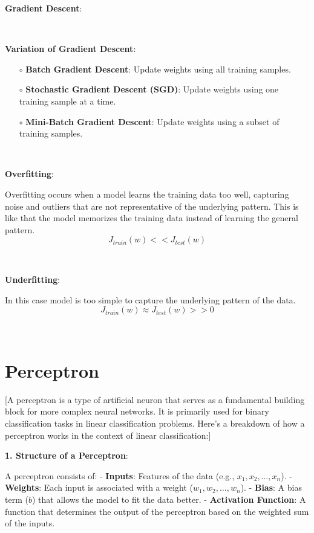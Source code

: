 \documentclass{article}
\newenvironment{cheatformula}[1][כותרת]{
    \begin{minipage}{\linewidth}
    \textbf{#1}:
}{
    \end{minipage}\\[2ex]
}
\begin{document}
\begin{multicols*}{2}
\begin{cheatformula}[Gradient Descent]
\end{cheatformula}

\begin{cheatformula}[Variation of Gradient Descent]
\begin{itemize}
  \item[$\circ$] \textbf{Batch Gradient Descent}: Update weights using all training samples.
  \item[$\circ$] \textbf{Stochastic Gradient Descent (SGD)}: Update weights using one training sample at a time.
  \item[$\circ$] \textbf{Mini-Batch Gradient Descent}: Update weights using a subset of training samples.
\end{itemize}
\end{cheatformula}

\begin{cheatformula}[Overfitting]
Overfitting occurs when a model learns the training data too well,
capturing noise and outliers that are not representative of the underlying pattern.
This is like that the model memorizes the training data instead of learning the general pattern.
$$J_{train}(w) << J_{test}(w) $$
\end{cheatformula}

\begin{cheatformula}[Underfitting]
In this case model is too simple to capture the underlying pattern of the data.
$$J_{train}(w) \approx  J_{test}(w)  >> 0 $$
\end{cheatformula}


\section{Perceptron}[A perceptron is a type of artificial neuron that serves
 as a fundamental building block for more complex neural
  networks. It is primarily used for binary classification
   tasks in linear classification problems. 
   Here’s a breakdown of how a perceptron works in the
    context of linear classification:]

\begin{cheatformula}[1. Structure of a Perceptron]
  A perceptron consists of:
  - \textbf{Inputs}: Features of the data (e.g., $x_1, x_2, \ldots, x_n$).
  - \textbf{Weights}: Each input is associated with a weight ($w_1, w_2, \ldots, w_n$).
  - \textbf{Bias}: A bias term ($b$) that allows the model to fit the data better.
  - \textbf{Activation Function}: A function that determines the output of the perceptron based on the weighted sum of the inputs.
  \end{cheatformula}


\end{multicols*}
\end{document}
